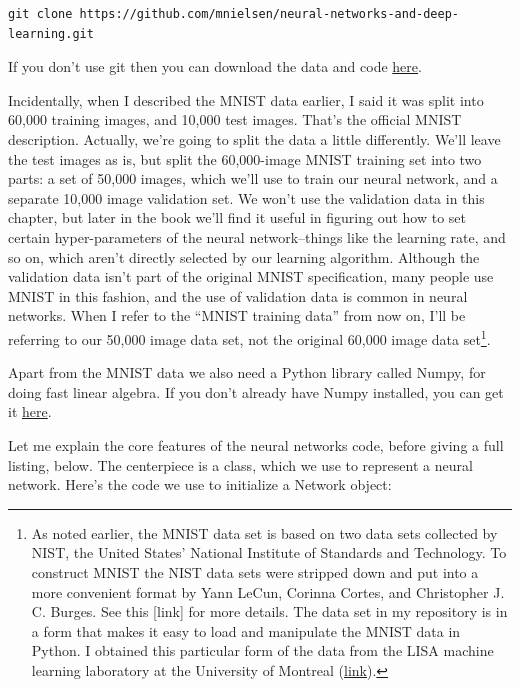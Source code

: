 \documentclass[a4paper,twoside,10pt]{book}
\begin{document}
\begin{lstlisting}
git clone https://github.com/mnielsen/neural-networks-and-deep-learning.git
\end{lstlisting}
If you don't use git then you can download the data and code \href{https://github.com/mnielsen/neural-networks-and-deep-learning/archive/master.zip}{here}.

Incidentally, when I described the MNIST data earlier, I said it was split into 60,000 training images, and 10,000 test images. That's the official MNIST description. Actually, we're going to split the data a little differently. We'll leave the test images as is, but split the 60,000-image MNIST training set into two parts: a set of 50,000 images, which we'll use to train our neural network, and a separate 10,000 image validation set. We won't use the validation data in this chapter, but later in the book we'll find it useful in figuring out how to set certain hyper-parameters of the neural network--things like the learning rate, and so on, which aren't directly selected by our learning algorithm. Although the validation data isn't part of the original MNIST specification, many people use MNIST in this fashion, and the use of validation data is common in neural networks. When I refer to the ``MNIST training data'' from now on, I'll be referring to our 50,000 image data set, not the original 60,000 image data set\footnote{As noted earlier, the MNIST data set is based on two data sets collected by NIST, the United States' National Institute of Standards and Technology. To construct MNIST the NIST data sets were stripped down and put into a more convenient format by Yann LeCun, Corinna Cortes, and Christopher J. C. Burges. See this [link] for more details. The data set in my repository is in a form that makes it easy to load and manipulate the MNIST data in Python. I obtained this particular form of the data from the LISA machine learning laboratory at the University of Montreal (\href{http://www.deeplearning.net/tutorial/gettingstarted.html}{link}).}.

Apart from the MNIST data we also need a Python library called Numpy, for doing fast linear algebra. If you don't already have Numpy installed, you can get it \href{http://www.scipy.org/install.html}{here}.

Let me explain the core features of the neural networks code, before giving a full listing, below. The centerpiece is a  class, which we use to represent a neural network. Here's the code we use to initialize a Network object:
\end{document}
